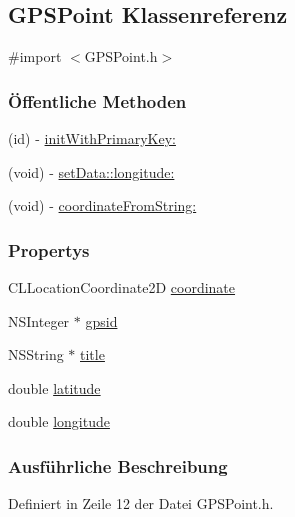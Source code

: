 \hypertarget{interface_g_p_s_point}{
\subsection{GPSPoint Klassenreferenz}
\label{interface_g_p_s_point}
}


{\ttfamily \#import $<$GPSPoint.h$>$}\subsubsection*{Öffentliche Methoden}
\begin{DoxyCompactItemize}
\item 
(id) -\/ \hyperlink{interface_g_p_s_point_a8c6767117b9803d4f1ac4a4b11ec4b0d}{initWithPrimaryKey:}
\item 
(void) -\/ \hyperlink{interface_g_p_s_point_a22ce3b0053229f96c6bf029ddeaaa504}{setData::longitude:}
\item 
(void) -\/ \hyperlink{interface_g_p_s_point_a2d74fe2063a4f68b5d4ea1d9eed77ae0}{coordinateFromString:}
\end{DoxyCompactItemize}
\subsubsection*{Propertys}
\begin{DoxyCompactItemize}
\item 
CLLocationCoordinate2D \hyperlink{interface_g_p_s_point_ac1135721ea8a2458bd7e6bb05a4f2bce}{coordinate}
\item 
NSInteger $\ast$ \hyperlink{interface_g_p_s_point_a45b895e9be26a0d7c0ae84139b47f4be}{gpsid}
\item 
NSString $\ast$ \hyperlink{interface_g_p_s_point_a6695a368f34ece5bf6181cb49b5fd6b2}{title}
\item 
double \hyperlink{interface_g_p_s_point_aeb7b3c8169a9ed47bce47101b2419216}{latitude}
\item 
double \hyperlink{interface_g_p_s_point_a6ac49bdcdd308340aa71e5236a6ed51a}{longitude}
\end{DoxyCompactItemize}


\subsubsection{Ausführliche Beschreibung}


Definiert in Zeile 12 der Datei GPSPoint.h.

